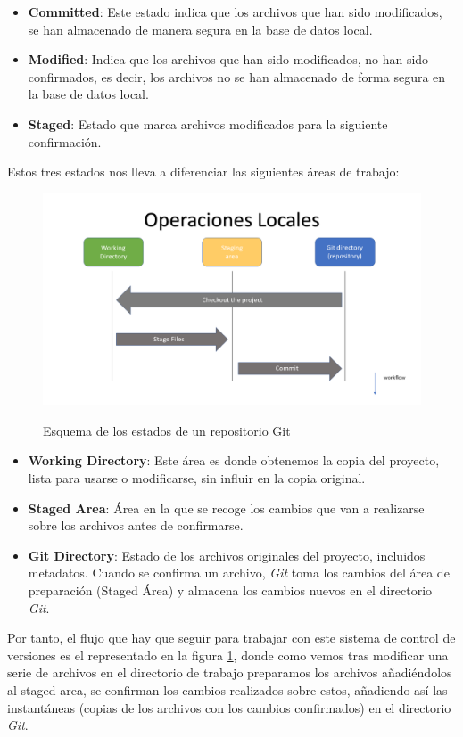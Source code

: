 \documentclass[a4paper, 12pt]{book}
\begin{document}
\begin{itemize}
    \item \textbf{Committed}: Este estado indica que los archivos que han sido modificados, se han almacenado de manera segura en la base de datos local.
    \item \textbf{Modified}: Indica que los archivos que han sido modificados, no han sido confirmados, es decir, los archivos no se han almacenado de forma segura en la base de datos local.
    \item \textbf{Staged}: Estado que marca archivos modificados para la siguiente confirmación. 
\end{itemize}
Estos tres estados nos lleva a diferenciar las siguientes áreas de trabajo: 
\begin{figure}[htbp]
    \centering
    \includegraphics[width=\textwidth]{img/git_states.png}
    \label{fig:gitStates}
    \caption{ Esquema de los estados de un repositorio Git}
\end{figure}
\begin{itemize}
    \item \textbf{Working Directory}: Este área es donde obtenemos la copia del proyecto, lista para usarse o modificarse, sin influir en la copia original.
    \item \textbf{Staged Area}: Área en la que se recoge los cambios que van a realizarse sobre los archivos antes de confirmarse.
    \item \textbf{Git Directory}: Estado de los archivos originales del proyecto, incluidos metadatos. Cuando se confirma un archivo, \emph{Git} toma los cambios del área de preparación (Staged Área) y almacena los cambios nuevos en el directorio \emph{Git}.
\end{itemize}
Por tanto, el flujo que hay que seguir para trabajar con este sistema de control de versiones es el representado en la figura \ref{fig:gitStates}, donde como vemos tras modificar una serie de archivos en el directorio de trabajo preparamos los archivos añadiéndolos al staged area, se confirman los cambios realizados sobre estos, añadiendo así las instantáneas (copias de los archivos con los cambios confirmados) en el directorio \emph{Git}. 
\end{document}
